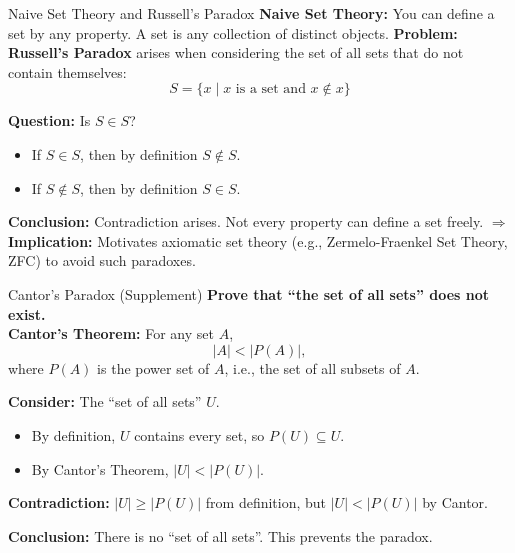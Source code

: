 \documentclass[dvipsnames]{beamer}
\theoremstyle{plain}
\theoremstyle{definition}
\newtheorem{remark}[theorem]{\translate{Remark}}
\begin{document}

\begin{frame}{Naive Set Theory and Russell's Paradox}
\textbf{Naive Set Theory:} You can define a set by any property. A set is any collection of distinct objects.
\textbf{Problem: Russell's Paradox} arises when considering the set of all sets that do not contain themselves:
\[
S = \{ x \mid x \text{ is a set and } x \notin x \}
\]

\textbf{Question:} Is $S \in S$?

\begin{itemize}
    \item If $S \in S$, then by definition $S \notin S$.
    \item If $S \notin S$, then by definition $S \in S$.
\end{itemize}

\textbf{Conclusion:} Contradiction arises. Not every property can define a set freely. $\Rightarrow$ \textbf{Implication:} Motivates axiomatic set theory (e.g., Zermelo-Fraenkel Set Theory, ZFC) to avoid such paradoxes.
\end{frame}

\begin{frame}{Cantor's Paradox (Supplement)}
\textbf{Prove that ``the set of all sets'' does not exist.} \\
\vspace{0.5em}
\textbf{Cantor's Theorem:} For any set $A$,
\[
|A| < |P(A)|,
\]
where $P(A)$ is the power set of $A$, i.e., the set of all subsets of $A$.

\textbf{Consider:} The ``set of all sets'' $U$.

\begin{itemize}
    \item By definition, $U$ contains every set, so $P(U) \subseteq U$.
    \item By Cantor's Theorem, $|U| < |P(U)|$.
\end{itemize}

\textbf{Contradiction:} $|U| \ge |P(U)|$ from definition, but $|U| < |P(U)|$ by Cantor.  

\textbf{Conclusion:} There is no ``set of all sets''. This prevents the paradox.
\end{frame}
\end{document}

